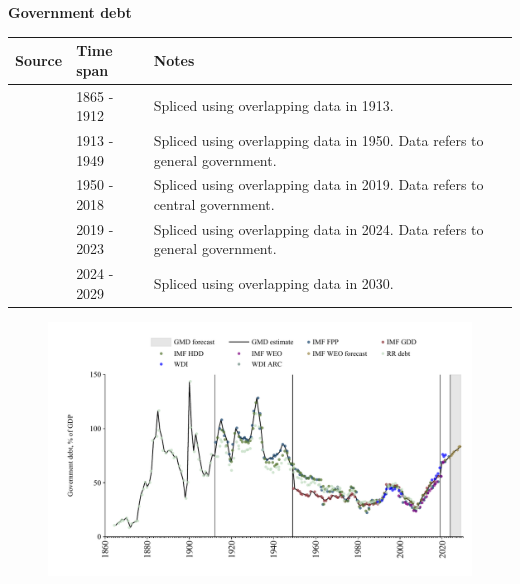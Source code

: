 \documentclass[12pt,a4paper,landscape]{article}
\begin{document}
\begin{adjustbox}{max totalsize={\paperwidth}{\paperheight},center}
\begin{minipage}[t][\textheight][t]{\textwidth}
\vspace*{0.5cm}
{}
\begin{center}
{\Large\bfseries Government debt}
\end{center}
\vspace{0.5cm}
\begin{table}[H]
\centering
\small
\begin{tabular}{|l|l|l|}
\hline
\textbf{Source} & \textbf{Time span} & \textbf{Notes} \\
\hline
\rowcolor{white}\cite{RR_debt}& 1865 - 1912 &Spliced using overlapping data in 1913. \\
\rowcolor{lightgray}\cite{IMF_FPP}& 1913 - 1949 &Spliced using overlapping data in 1950. Data refers to general government.\\
\rowcolor{white}\cite{IMF_GDD}& 1950 - 2018 &Spliced using overlapping data in 2019. Data refers to central government.\\
\rowcolor{lightgray}\cite{IMF_FPP}& 2019 - 2023 &Spliced using overlapping data in 2024. Data refers to general government.\\
\rowcolor{white}\cite{IMF_WEO_forecast}& 2024 - 2029 &Spliced using overlapping data in 2030. \\
\hline
\end{tabular}
\end{table}
\begin{figure}[H]
\centering
\includegraphics[width=\textwidth,height=0.6\textheight,keepaspectratio]{graphs/ZAF_govdebt_GDP.pdf}
\end{figure}
\end{minipage}
\end{adjustbox}
\end{document}
